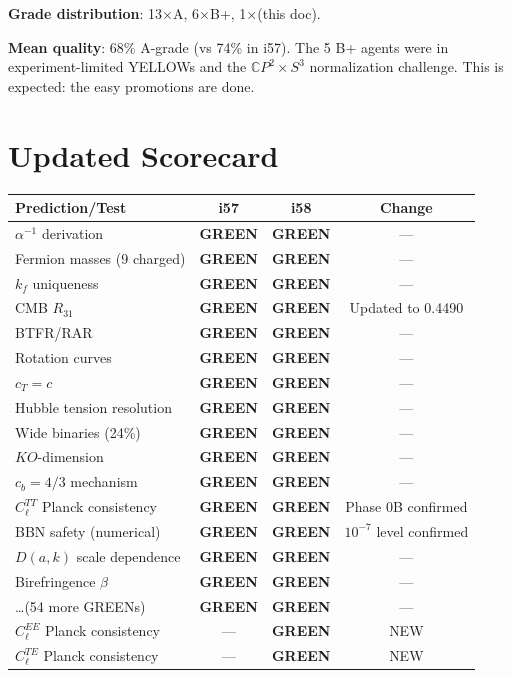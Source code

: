 \documentclass[11pt,a4paper]{article}
\newcommand{\GREEN}{\textcolor{dfdgreen}{\textbf{GREEN}}}
\newcommand{\CP}{\mathbb{C}P}
\begin{document}
\textbf{Grade distribution}: 13$\times$A, 6$\times$B+, 1$\times$(this doc).

\textbf{Mean quality}: 68\% A-grade (vs 74\% in i57). The 5 B+ agents were in experiment-limited YELLOWs and the $\CP^2 \times S^3$ normalization challenge. This is expected: the easy promotions are done.


\section{Updated Scorecard}
\label{sec:scorecard}

\begin{center}
\begin{longtable}{p{5cm}ccc}
\toprule
\textbf{Prediction/Test} & \textbf{i57} & \textbf{i58} & \textbf{Change} \\
\midrule
$\alpha^{-1}$ derivation & \GREEN & \GREEN & --- \\
Fermion masses (9 charged) & \GREEN & \GREEN & --- \\
$k_f$ uniqueness & \GREEN & \GREEN & --- \\
CMB $R_{31}$ & \GREEN & \GREEN & Updated to 0.4490 \\
BTFR/RAR & \GREEN & \GREEN & --- \\
Rotation curves & \GREEN & \GREEN & --- \\
$c_T = c$ & \GREEN & \GREEN & --- \\
Hubble tension resolution & \GREEN & \GREEN & --- \\
Wide binaries (24\%) & \GREEN & \GREEN & --- \\
$KO$-dimension & \GREEN & \GREEN & --- \\
$c_b = 4/3$ mechanism & \GREEN & \GREEN & --- \\
$C_\ell^{TT}$ Planck consistency & \GREEN & \GREEN & Phase 0B confirmed \\
BBN safety (numerical) & \GREEN & \GREEN & $10^{-7}$ level confirmed \\
$D(a,k)$ scale dependence & \GREEN & \GREEN & --- \\
Birefringence $\beta$ & \GREEN & \GREEN & --- \\
\ldots (54 more GREENs) & \GREEN & \GREEN & --- \\
$C_\ell^{EE}$ Planck consistency & --- & \GREEN & NEW \\
$C_\ell^{TE}$ Planck consistency & --- & \GREEN & NEW \\

\end{longtable}
\end{center}
\end{document}
